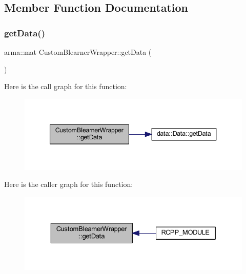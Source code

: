 \subsection{Member Function Documentation}
\mbox{\label{class_custom_blearner_wrapper_a3153378a0c0ee8c4633d42680195eeda}} 
\subsubsection{\texorpdfstring{get\+Data()}{getData()}}
{\footnotesize\ttfamily arma\+::mat Custom\+Blearner\+Wrapper\+::get\+Data (\begin{DoxyParamCaption}{ }\end{DoxyParamCaption})\hspace{0.3cm}{\ttfamily [inline]}}

Here is the call graph for this function\+:\nopagebreak
\begin{figure}[H]
\begin{center}
\leavevmode
\includegraphics[width=340pt]{class_custom_blearner_wrapper_a3153378a0c0ee8c4633d42680195eeda_cgraph}
\end{center}
\end{figure}
Here is the caller graph for this function\+:\nopagebreak
\begin{figure}[H]
\begin{center}
\leavevmode
\includegraphics[width=329pt]{class_custom_blearner_wrapper_a3153378a0c0ee8c4633d42680195eeda_icgraph}
\end{center}
\end{figure}
\mbox{\label{class_custom_blearner_wrapper_ae012429cb317fae84ab8028c76c2b70d}} 
